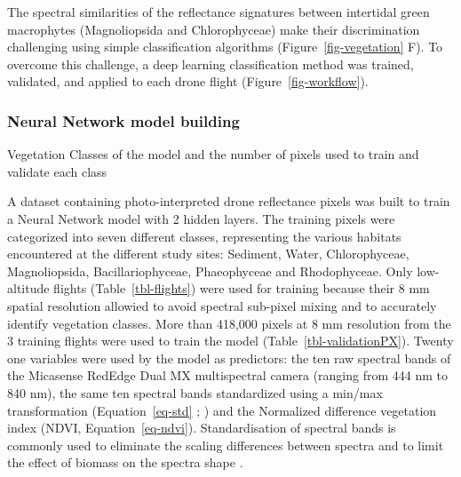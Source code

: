 \documentclass[
  number]{elsarticle}
\begin{document}
The spectral similarities of the reflectance signatures between
intertidal green macrophytes (Magnoliopsida and Chlorophyceae) make
their discrimination challenging using simple classification algorithms
(Figure~\ref{fig-vegetation} F). To overcome this challenge, a deep
learning classification method was trained, validated, and applied to
each drone flight (Figure~\ref{fig-workflow}).

\subsubsection{Neural Network model
building}\label{neural-network-model-building}

\begin{table}

\caption{\label{tbl-validationPX}Vegetation Classes of the model and the
number of pixels used to train and validate each class}


\end{table}%

A dataset containing photo-interpreted drone reflectance pixels was
built to train a Neural Network model with 2 hidden layers. The training
pixels were categorized into seven different classes, representing the
various habitats encountered at the different study sites: Sediment,
Water, Chlorophyceae, Magnoliopsida, Bacillariophyceae, Phaeophyceae and
Rhodophyceae. Only low-altitude flights (Table~\ref{tbl-flights}) were
used for training because their 8 mm spatial resolution allowied to
avoid spectral sub-pixel mixing and to accurately identify vegetation
classes. More than 418,000 pixels at 8 mm resolution from the 3 training
flights were used to train the model (Table~\ref{tbl-validationPX}).
Twenty one variables were used by the model as predictors: the ten raw
spectral bands of the Micasense RedEdge Dual MX multispectral camera
(ranging from 444 nm to 840 nm), the same ten spectral bands
standardized using a min/max transformation (Equation~\ref{eq-std} ;
\citep{Cao2017}) and the Normalized difference vegetation index (NDVI,
Equation~\ref{eq-ndvi}). Standardisation of spectral bands is commonly
used to eliminate the scaling differences between spectra and to limit
the effect of biomass on the spectra shape \citetext{\citealp[
]{Douay2022}; \citealp{Davies2023}}.
\end{document}

